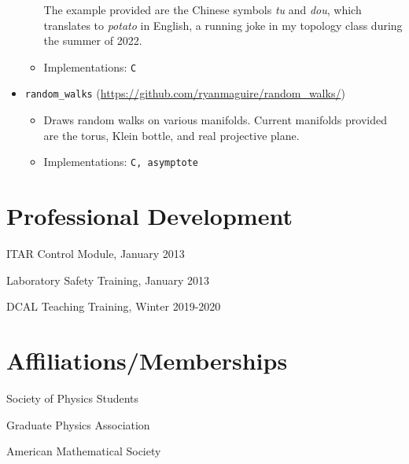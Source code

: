 \documentclass[a4paper,sans]{moderncv}
\begin{document}
\begin{itemize}
\begin{itemize}
                        The example provided are the Chinese symbols
                        \textit{tu} and \textit{dou}, which translates to
                        \textit{potato} in English, a running joke in my
                        topology class during the summer of 2022.
                    \item
                        Implementations: \texttt{C}
                \end{itemize}
            \item
                \texttt{random\_walks}
                (\url{https://github.com/ryanmaguire/random_walks/})
                \begin{itemize}
                    \item
                        Draws random walks on various manifolds. Current
                        manifolds provided are the torus, Klein bottle, and
                        real projective plane.
                    \item Implementations: \texttt{C, asymptote}
                \end{itemize}
        \end{itemize}
    \section{Professional Development}
        \begin{itemize}
            \begin{multicols}{2}
                \item ITAR Control Module, January 2013
                \item Laboratory Safety Training, January 2013
                \item DCAL Teaching Training, Winter 2019-2020
            \end{multicols}
        \end{itemize}
    \section{Affiliations/Memberships}
        \begin{itemize}
            \begin{multicols}{2}
                \item Society of Physics Students
                \item Graduate Physics Association
                \item American Mathematical Society
            \end{multicols}
        \end{itemize}
\end{document}
